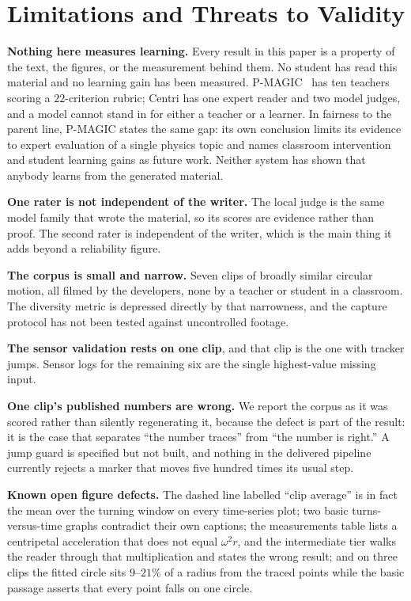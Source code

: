 \documentclass[conference]{IEEEtran}
\begin{document}
\section{Limitations and Threats to Validity}

\textbf{Nothing here measures learning.} Every result in this paper is a
property of the text, the figures, or the measurement behind them. No student
has read this material and no learning gain has been measured. P-MAGIC~\cite{pmagic}
has ten teachers scoring a $22$-criterion rubric; Centri has one expert reader
and two model judges, and a model cannot stand in for either a teacher
or a learner. In fairness to the parent line, P-MAGIC states the same gap: its
own conclusion limits its evidence to expert evaluation of a single physics
topic and names classroom intervention and student learning gains as future
work. Neither system has shown that anybody learns from the generated
material.

\textbf{One rater is not independent of the writer.} The local judge is the
same model family that wrote the material, so its scores are evidence rather
than proof. The second rater is independent of the writer, which is the main
thing it adds beyond a reliability figure.

\textbf{The corpus is small and narrow.} Seven clips of broadly similar
circular motion, all filmed by the developers, none by a teacher or student in
a classroom. The diversity metric is depressed directly by that narrowness, and
the capture protocol has not been tested against uncontrolled footage.

\textbf{The sensor validation rests on one clip}, and that clip is the one with
tracker jumps. Sensor logs for the remaining six are the single highest-value
missing input.

\textbf{One clip's published numbers are wrong.} We report the corpus as it was
scored rather than silently regenerating it, because the defect is part of the
result: it is the case that separates ``the number traces'' from ``the number is
right.'' A jump guard is specified but not built, and nothing in the delivered
pipeline currently rejects a marker that moves five hundred times its usual
step.

\textbf{Known open figure defects.} The dashed line labelled ``clip average''
is in fact the mean over the turning window on every time-series plot; two
basic turns-versus-time graphs contradict their own captions; the measurements
table lists a centripetal acceleration that does not equal $\omega^{2}r$, and
the intermediate tier walks the reader through that multiplication and states
the wrong result; and on three clips the fitted circle sits $9$--$21\%$ of a
radius from the traced points while the basic passage asserts that every point
falls on one circle.
\end{document}
